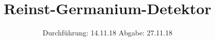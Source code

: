 

\subject{V18}
\title{Reinst-Germanium-Detektor}
\date{%
  Durchführung: 14.11.18
  \hspace{3em}
  Abgabe: 27.11.18
}



\maketitle
\thispagestyle{empty}
\tableofcontents
\newpage






\printbibliography{}


